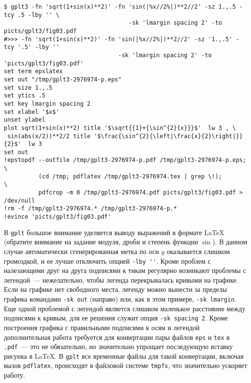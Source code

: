 \documentclass[12pt]{article}
\def\gplt{{\tt gplt}}
\def\pdf{{\tt .pdf}}
\begin{document}
{\small
\begin{verbatim}
$ gplt3 -fn 'sqrt(1+sin(x)**2)' -fn 'sin(|%x//2%|)**2//2' -sz 1.,.5 -tcy .5 -lby '' \
                                    -sk 'lmargin spacing 2' -to picts/gplt3/fig03.pdf
#>>> -fn 'sqrt(1+sin(x)**2)' -fn 'sin(|%x//2%|)**2//2' -sz '1.,.5' -tcy '.5' -lby '' 
                                 -sk 'lmargin spacing 2' -to 'picts/gplt3/fig03.pdf'
set term epslatex 
set out "/tmp/gplt3-2976974-p.eps"
set size 1.,.5
set ytics .5
set key lmargin spacing 2
set xlabel '$x$'
unset ylabel
plot sqrt(1+sin(x)**2) title '$\sqrt{{1}+{\sin^{2}{x}}}$'  lw 3 , \
 sin(abs(x/2))**2/2 title '$\frac{\sin^{2}{\left|\frac{x}{2}\right|}}{2}$'  lw 3 
set out
!epstopdf --outfile /tmp/gplt3-2976974-p.pdf /tmp/gplt3-2976974-p.eps;        \
          (cd /tmp; pdflatex /tmp/gplt3-2976974.tex | grep \!);               \
          pdfcrop -m 0 /tmp/gplt3-2976974.pdf picts/gplt3/fig03.pdf > /dev/null
!rm -f /tmp/gplt3-2976974.* /tmp/gplt3-2976974-p.*
!evince 'picts/gplt3/fig03.pdf'
\end{verbatim}
  }
\begin{figure}
  \begin{center}
\end{center}
\end{figure}
\noindent
В \gplt{} большое внимание уделяется выводу выражений в формате \LaTeX{} (обратите внимание на задание модуля, дроби и степень функции $\sin$).
В данном случае автоматически сгенерированная метка по оси $y$ оказывается слишком громоздкой, и ее лучше отключить опцией \verb|-lby ''|.
Кроме проблем с налезающими друг на друга подписями к тикам регулярно возникают проблемы с легендой~--- нежелательно, чтобы легенда
перекрывалась кривыми на графике. Если на графике нет свободного места, легенду можно вынести за пределы графика командами \verb'-sk out' (направо)
или, как в этом примере, \verb'-sk lmargin'. Еще одной проблемой с легендой является слишком маленькое расстояние между подписями к кривым,
для ее решения служит опция \verb'-sk spacing 2'. Кроме построения графика с правильными подписями к осям и легендой дополнительная работа
требуется для конвертации пары файлов \verb'eps' и \verb'tex' в \pdf~--- это не обязательно, но значительно упрощает последующую вставку рисунка
в \LaTeX. В \gplt{} все временные файлы для такой конвертации, включая вызов \verb'pdflatex', происходят в файловой системе \verb'tmpfs',
что значительно ускоряет работу.\\
\end{document}

